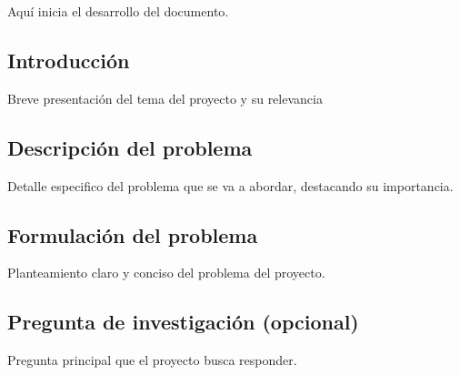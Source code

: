 \documentclass[12pt,letterpaper]{report}
\begin{document}
	Aquí inicia el desarrollo del documento.
	\subsection{Introducción}
	Breve presentación del tema del proyecto y su relevancia
	\subsection{Descripción del problema}
	Detalle especifico del problema que se va a abordar, destacando su importancia.
	\subsection{Formulación del problema}
	Planteamiento claro y conciso del problema del proyecto.
	\subsection{Pregunta de investigación (opcional)}
	Pregunta principal que el proyecto busca responder.
\end{document}
